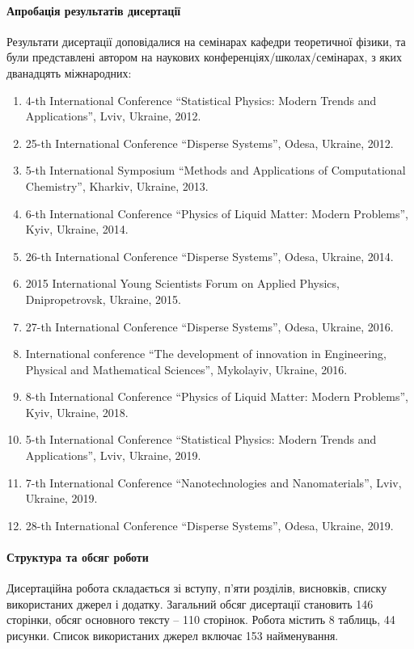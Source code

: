 \paragraph{Апробація результатів дисертації}\hfill\par
Результати дисертації доповідалися на семінарах кафедри теоретичної 
фізики, та були представлені автором на наукових
конференціях/школах/семіна\-рах, з яких дванадцять міжнародних:
\begin{enumerate}[leftmargin=1cm] %
	\item 4-th International Conference ``Statistical Physics: Modern Trends and Applications'', Lviv, Ukraine, 2012.
	\item 25-th International Conference ``Disperse Systems'', Odesa, Ukraine, 2012.
	\item 5-th International Symposium ``Methods and Applications of Computational Chemistry'',  Kharkiv, Ukraine, 2013.
	\item 6-th International Conference ``Physics  of  Liquid  Matter:  Modern Prob\-lems'',  Kyiv, Ukraine, 2014.
	\item 26-th International Conference ``Disperse Systems'',  Odesa, Ukraine, 2014.
	\item 2015 International Young Scientists Forum on Applied Physics,  Dnipropetrovsk, Ukraine, 2015.
	\item 27-th International Conference ``Disperse Systems'', Odesa, Ukraine, 2016.
	\item International conference ``The development of innovation in Engineering, Physical and Mathematical Sciences'', Mykolayiv, Ukraine, 2016.
	\item 8-th International  Conference ``Physics  of  Liquid  Matter: Modern Prob\-lems'', Kyiv, Ukraine, 2018.
	\item 5-th International Conference ``Statistical Physics: Modern Trends and Applications'', Lviv, Ukraine, 2019.
	\item 7-th International Conference ``Nanotechnologies and Nanomaterials'',  Lviv, Ukraine, 2019.
	\item 28-th International Conference ``Disperse Systems'', Odesa, Ukraine, 2019.
\end{enumerate}


\paragraph{Структура та обсяг роботи}\hfill\par
Дисертаційна робота складається зі вступу, п'яти розділів, висновків, списку використаних джерел і додатку. Загальний обсяг дисертації становить 146 сторінки, обсяг основного тексту -- 110 сторінок. Робота містить 8 таблиць, 44 рисунки. Список використаних джерел включає 153 найменування.